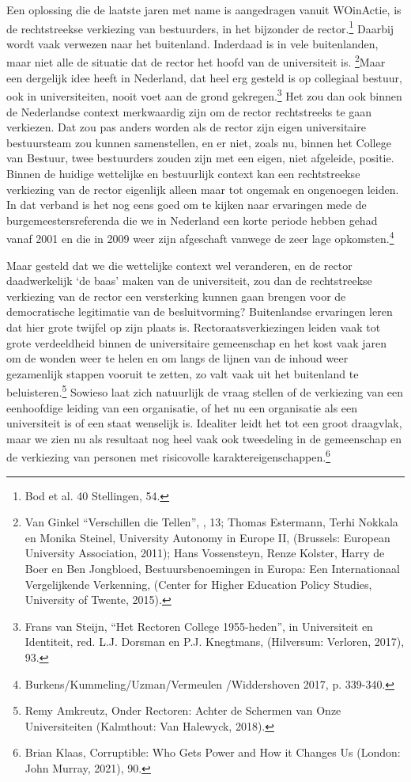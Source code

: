 \documentclass{jote-book}
\begin{document}
	Een oplossing die de laatste jaren met name is aangedragen vanuit WOinActie, is de rechtstreekse verkiezing van bestuurders, in het bijzonder de rector.\footnote{Bod et al. 40 Stellingen, 54.} Daarbij wordt vaak verwezen naar het buitenland. Inderdaad is in vele buitenlanden, maar niet alle de situatie dat de rector het hoofd van de universiteit is.\textsuperscript{ }\footnote{Van Ginkel “Verschillen die Tellen”, , 13; Thomas Estermann, Terhi Nokkala en Monika Steinel, University Autonomy in Europe II, (Brussels: European University Association, 2011); Hans Vossensteyn, Renze Kolster, Harry de Boer en Ben Jongbloed, Bestuursbenoemingen in Europa: Een Internationaal Vergelijkende Verkenning, (Center for Higher Education Policy Studies, University of Twente, 2015).}Maar een dergelijk idee heeft in Nederland, dat heel erg gesteld is op collegiaal bestuur, ook in universiteiten, nooit voet aan de grond gekregen.\footnote{Frans van Steijn, “Het Rectoren College 1955-heden”, in Universiteit en Identiteit, red. L.J. Dorsman en P.J. Knegtmans, (Hilversum: Verloren, 2017), 93.} Het zou dan ook binnen de Nederlandse context merkwaardig zijn om de rector rechtstreeks te gaan verkiezen. Dat zou pas anders worden als de rector zijn eigen universitaire bestuursteam zou kunnen samenstellen, en er niet, zoals nu, binnen het College van Bestuur, twee bestuurders zouden zijn met een eigen, niet afgeleide, positie. Binnen de huidige wettelijke en bestuurlijk context kan een rechtstreekse verkiezing van de rector eigenlijk alleen maar tot ongemak en ongenoegen leiden. In dat verband is het nog eens goed om te kijken naar ervaringen mede de burgemeestersreferenda die we in Nederland een korte periode hebben gehad vanaf 2001 en die in 2009 weer zijn afgeschaft vanwege de zeer lage opkomsten.\footnote{Burkens/Kummeling/Uzman/Vermeulen /Widdershoven 2017, p. 339-340.}



	Maar gesteld dat we die wettelijke context wel veranderen, en de rector daadwerkelijk ‘de baas' maken van de universiteit, zou dan de rechtstreekse verkiezing van de rector een versterking kunnen gaan brengen voor de democratische legitimatie van de besluitvorming? Buitenlandse ervaringen leren dat hier grote twijfel op zijn plaats is. Rectoraatsverkiezingen leiden vaak tot grote verdeeldheid binnen de universitaire gemeenschap en het kost vaak jaren om de wonden weer te helen en om langs de lijnen van de inhoud weer gezamenlijk stappen vooruit te zetten, zo valt vaak uit het buitenland te beluisteren.\footnote{Remy Amkreutz, Onder Rectoren: Achter de Schermen van Onze Universiteiten (Kalmthout: Van Halewyck, 2018).} Sowieso laat zich natuurlijk de vraag stellen of de verkiezing van een eenhoofdige leiding van een organisatie, of het nu een organisatie als een universiteit is of een staat wenselijk is. Idealiter leidt het tot een groot draagvlak, maar we zien nu als resultaat nog heel vaak ook tweedeling in de gemeenschap en de verkiezing van personen met risicovolle karaktereigenschappen.\footnote{Brian Klaas, Corruptible: Who Gets Power and How it Changes Us (London: John Murray, 2021), 90.}
\end{document}
